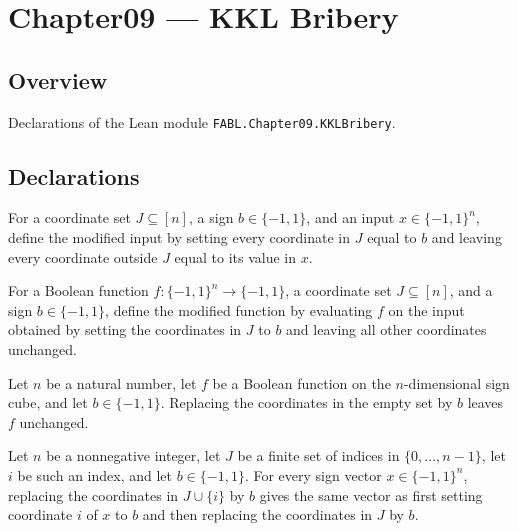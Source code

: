\chapter{Chapter09 — KKL Bribery}
\section{Overview}

Declarations of the Lean module \texttt{FABL.Chapter09.KKLBribery}.

\section{Declarations}

\begin{definition}
\label{FABL.bribeInput}
\leanok
{}
For a coordinate set $J\subseteq[n]$, a sign $b\in\{-1,1\}$, and an input
$x\in\{-1,1\}^n$, define the modified input by setting every coordinate in $J$ equal to
$b$ and leaving every coordinate outside $J$ equal to its value in $x$.
\end{definition}

\begin{definition}
\label{FABL.bribeFunction}
\leanok
{}
For a Boolean function $f:\{-1,1\}^n\to\{-1,1\}$, a coordinate set $J\subseteq[n]$, and
a sign $b\in\{-1,1\}$, define the modified function by evaluating $f$ on the input
obtained by setting the coordinates in $J$ to $b$ and leaving all other coordinates
unchanged.
\end{definition}

\begin{theorem}
\label{FABL.bribeFunction_empty}
\leanok
{}
Let $n$ be a natural number, let $f$ be a Boolean function on the $n$-dimensional sign
cube, and let $b\in\{-1,1\}$. Replacing the coordinates in the empty set by $b$ leaves
$f$ unchanged.
\end{theorem}

\begin{theorem}
\label{FABL.bribeInput_insert}
\leanok
{}
Let $n$ be a nonnegative integer, let $J$ be a finite set of indices in
$\{0,\ldots,n-1\}$, let $i$ be such an index, and let $b\in\{-1,1\}$. For every sign
vector $x\in\{-1,1\}^n$, replacing the coordinates in $J\cup\{i\}$ by $b$ gives the same
vector as first setting coordinate $i$ of $x$ to $b$ and then replacing the coordinates
in $J$ by $b$.
\end{theorem}

